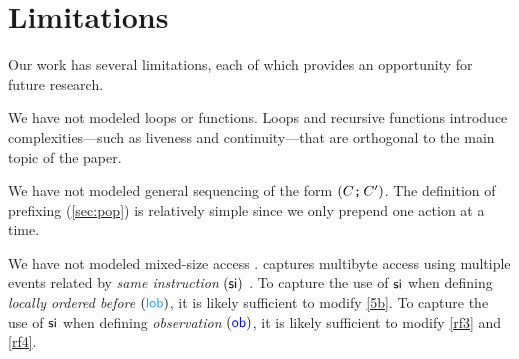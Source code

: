 

\section{Limitations}
\label{sec:limits}


 Our work has several limitations, each of which provides an opportunity for
future research.  %

We have not modeled loops or functions.  Loops and recursive functions
introduce complexities\allowbreak{}---such as liveness and continuity---that
are orthogonal to the main topic of the paper.

We have not modeled general sequencing of the form $(C\texttt{;}\,\allowbreak C')$.  The
definition of prefixing (\textsection\ref{sec:pop}) is relatively simple
since we only prepend one action at a time.

We have not modeled mixed-size access
\cite{DBLP:conf/popl/FlurSPNMGSBS17,DBLP:conf/pldi/WattPPBDFPG20}.  
\armeight{} captures multibyte access using multiple events related by
\emph{same instruction} $(\mathrel{\mathsf{si}})$ \cite{alglave-git}. To capture the use of
$\mathrel{\mathsf{si}}$ when defining \emph{locally ordered before} $(\rlob)$, it is likely
sufficient to modify \ref{5b}.  To capture the use of $\mathrel{\mathsf{si}}$ when defining
\emph{observation} $(\mathrel{\textcolor{blue}{\mathsf{ob}}})$, it is likely sufficient to modify \ref{rf3} and
\ref{rf4}.

